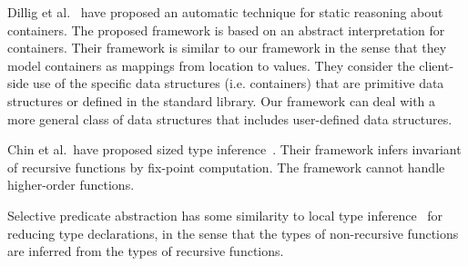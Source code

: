 Dillig et al.~\cite{Dillig2011} have proposed an automatic technique for
static reasoning about containers.  The proposed framework is based on
an abstract interpretation for containers.  Their framework is similar
to our framework in the sense that they model containers as mappings
from location to values.  They consider the client-side use of the
specific data structures (i.e. containers) that are primitive data
structures or defined in the standard library.  Our framework can deal with a
more general class of data structures that includes user-defined data
structures.

Chin et al.~have proposed sized type inference~\cite{Chin2003}.  Their
framework infers invariant of recursive functions by fix-point
computation.  The framework cannot handle higher-order functions.

Selective predicate abstraction has some similarity to local type
inference~\cite{Pierce2000} for reducing type declarations, in the sense
that the types of non-recursive functions are inferred from the types of
recursive functions.
